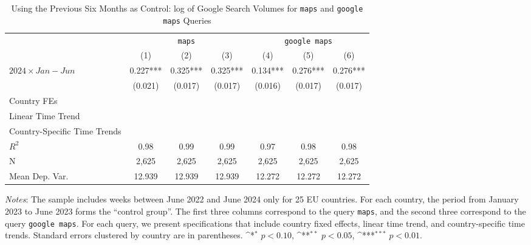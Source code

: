 \documentclass[11pt]{article}
\begin{document}
	
	\begin{table}[h]
		\centering
		\def\sym#1{\ifmmode^{#1}\else\(^{#1}\)\fi}
		\caption{\label{tab:did_new} Using the Previous Six Months as Control: log of Google Search Volumes for \texttt{maps} and \texttt{google maps} Queries}
		\begin{threeparttable}
			\begin{tabular}{lcccccc}
				\hline \noalign{\smallskip} 
				& \multicolumn{3}{c}{\texttt{maps}} & \multicolumn{3}{c}{\texttt{google maps}}  \\ \cmidrule(lr){2-4}\cmidrule(lr){5-7}
				
				&         (1)   &         (2)   &         (3)   &         (4)   &         (5)   &         (6)   \\
				\midrule
				$ 2024 \times Jan-Jun $ &       0.227***&       0.325***&       0.325***&       0.134***&       0.276***&       0.276***\\
				&     (0.021)   &     (0.017)   &     (0.017)   &     (0.016)   &     (0.017)   &     (0.017)   \\
				
				Country FEs         &  \checkmark   &  \checkmark   &  \checkmark   &  \checkmark   &  \checkmark   &  \checkmark   \\
				Linear Time Trend   &               &  \checkmark   &               &               &  \checkmark   &               \\
				Country-Specific Time Trends&               &               &  \checkmark   &               &               &  \checkmark   \\
				$ R ^2 $            &        0.98   &        0.99   &        0.99   &        0.97   &        0.98   &        0.98   \\
				N                   &       2,625   &       2,625   &       2,625   &       2,625   &       2,625   &       2,625   \\
				Mean Dep. Var.      &      12.939   &      12.939   &      12.939   &      12.272   &      12.272   &      12.272   \\
				\midrule
				
			\end{tabular}
			
			\begin{tablenotes}
				\item \footnotesize \emph{Notes}: The sample includes weeks between June 2022 and June 2024 only for 25 EU countries. For each country, the period from January 2023 to June 2023 forms the ``control group''. The first three columns correspond to the query \texttt{maps}, and the second three correspond to the query \texttt{google maps}. For each query, we present specifications that include country fixed effects, linear time trend, and country-specific time trends. Standard errors clustered by country are in parentheses. \sym{*} \(p<0.10\), \sym{**} \(p<0.05\), \sym{***}  \(p<0.01\). 
			\end{tablenotes}
		\end{threeparttable}
	\end{table}
	
\end{document}
